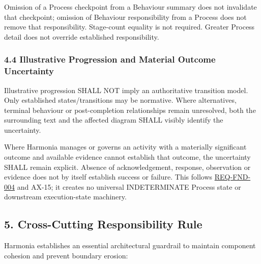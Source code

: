 \label{rad:metamodel:232}

Omission of a Process checkpoint from a Behaviour summary does not invalidate that checkpoint; omission of Behaviour responsibility from a Process does not remove that responsibility. Stage-count equality is not required. Greater Process detail does not override established responsibility.

\label{rad:metamodel:234}
\subsubsection*{4.4 Illustrative Progression and Material Outcome Uncertainty}
\label{rad:metamodel:236}

Illustrative progression SHALL NOT imply an authoritative transition model. Only established states/\allowbreak{}transitions may be normative. Where alternatives, terminal behaviour or post-completion relationships remain unresolved, both the surrounding text and the affected diagram SHALL visibly identify the uncertainty.

\label{rad:metamodel:238}

Where Harmonia manages or governs an activity with a materially significant outcome and available evidence cannot establish that outcome, the uncertainty SHALL remain explicit. Absence of acknowledgement, response, observation or evidence does not by itself establish success or failure. This follows \href{https://github.com/fhirfactory/harmonia/blob/98410db60155198a75f74c79d98060070209faa1/docs/markdown/01-motivation/requirements-constraints/foundational-requirements.md\#req-fnd-004-explicit-indeterminate-outcome}{REQ-FND-004} and AX-15; it creates no universal INDETERMINATE Process state or downstream execution-state machinery.

\label{rad:metamodel:240}

\par\smallskip
{}\label{rad:metamodel:242}
\subsection*{5. Cross-Cutting Responsibility Rule}
\label{rad:metamodel:244}

Harmonia establishes an essential architectural guardrail to maintain component cohesion and prevent boundary erosion:

\label{rad:metamodel:246}

